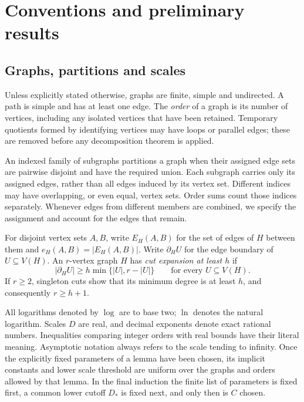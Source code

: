 \section{Conventions and preliminary results}\label{sec:preliminaries}

\subsection{Graphs, partitions and scales}

Unless explicitly stated otherwise, graphs are finite, simple and
undirected. A path is simple and has at least one edge. The
\emph{order} of a graph is its number of vertices, including any
isolated vertices that have been retained. Temporary quotients
formed by identifying vertices may have loops or parallel edges;
these are removed before any decomposition theorem is applied.

An indexed family of subgraphs partitions a graph when their
assigned edge sets are pairwise disjoint and have the required
union. Each subgraph carries only its assigned edges, rather than
all edges induced by its vertex set. Different indices may have
overlapping, or even equal, vertex sets. Order sums count those
indices separately. Whenever edges from different members are
combined, we specify the assignment and account for the edges
that remain.

For disjoint vertex sets \(A,B\), write \(E_H(A,B)\) for the set
of edges of \(H\) between them and \(e_H(A,B)=|E_H(A,B)|\).
Write \(\partial_H U\) for
the edge boundary of \(U\subseteq V(H)\). An \(r\)-vertex graph
\(H\) has \emph{cut expansion at least \(h\)} if
\begin{equation}\label{eq:cut-expansion}
 |\partial_H U|\ge h\min\{|U|,r-|U|\}
 \qquad\text{for every }U\subseteq V(H).
\end{equation}
If \(r\ge2\), singleton cuts show that its minimum degree is at
least \(h\), and consequently \(r\ge h+1\).

All logarithms denoted by \(\log\) are to base two; \(\ln\)
denotes the natural logarithm. Scales \(D\) are real, and decimal
exponents denote exact rational numbers. Inequalities comparing
integer orders with real bounds have their literal meaning.
Asymptotic notation always refers to the scale tending to
infinity. Once the explicitly fixed parameters of a lemma have
been chosen, its implicit constants and lower scale threshold
are uniform over the graphs and orders allowed by that lemma.
In the final induction the finite list of parameters is fixed
first, a common lower cutoff \(D_*\) is fixed next, and only then
is \(C\) chosen.

